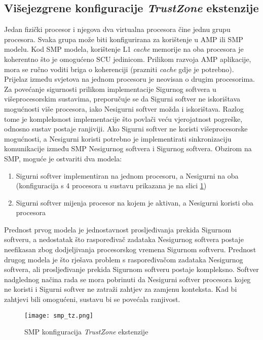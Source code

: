 \documentclass[times, utf8, diplomski, numeric]{fer}
\begin{document}
\subsection{Višejezgrene konfiguracije \textit{TrustZone} ekstenzije}
Jedan fizički procesor i njegova dva virtualna procesora čine jednu grupu procesora. Svaka grupa može biti konfigurirana za
korištenje u AMP ili SMP modelu. Kod SMP modela, korištenje L1 \textit{cache} memorije na oba procesora je koherentno što
je omogućeno SCU jedinicom. Prilikom razvoja AMP aplikacije, mora se ručno voditi briga o koherenciji (prazniti \textit{cache}
gdje je potrebno). Prijelaz između svjetova na jednom procesoru je neovisan o drugim procesorima. Za povećanje sigurnosti
prilikom implementacije Sigurnog softvera u višeprocesorskim sustavima, preporučuje se da Sigurni softver ne iskorištava
mogućnosti više procesora, iako Nesigurni softver možda i iskorištava. Razlog tome je kompleksnost implementacije što povlači
veću vjerojatnost pogreške, odnosno sustav postaje ranjiviji. Ako Sigurni softver ne koristi višeprocesorske mogućnosti,
a Nesigurni koristi potrebno je implementirati sinkronizaciju komunikacije između SMP Nesigurnog softvera i Sigurnog softvera.
Obzirom na SMP, moguće je ostvariti dva modela:
\begin{enumerate}
  \item{Sigurni softver implementiran na jednom procesoru, a Nesigurni na oba (konfiguracija s 4 procesora u sustavu prikazana
  je na slici \ref{smp_tz})}
  \item{Sigurni softver mijenja procesor na kojem je aktivan, a Nesigurni koristi oba procesora}
\end{enumerate}
Prednost prvog modela je jednostavnost prosljeđivanja prekida Sigurnom softveru, a nedostatak što raspoređivač zadataka
Nesigurnog softvera postaje neefikasan zbog dodjeljivanja procesorskog vremena Sigurnom softveru. Prednost drugog modela je
što rješava problem s raspoređivačom zadataka Nesigurnog softvera, ali prosljeđivanje prekida Sigurnom softveru postaje
kompleksno. Softver nadglednog načina rada se mora pobrinuti da Nesigurni softver procesora kojeg ne koristi i Sigurni softver
ne zatraži zahtjev za zamjenu konteksta. Kad bi zahtjevi bili omogućeni, sustavu bi se povećala ranjivost.
\begin{figure}[H]
  \centering
	\texttt{[image: smp\_tz.png]}%
	\caption{SMP konfiguracija \textit{TrustZone} ekstenzije \cite{tz_wp}}
	\label{smp_tz}%
\end{figure}
\end{document}
